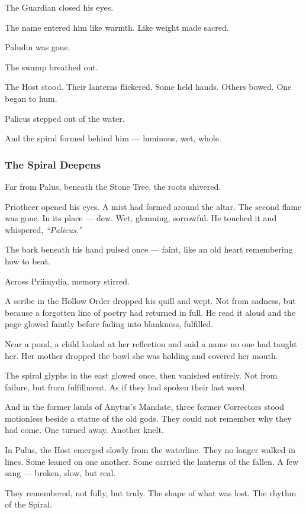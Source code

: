 \documentclass[12pt]{article}
\begin{document}
The Guardian closed his eyes.

The name entered him like warmth. Like weight made sacred.

Paludin was gone.

The swamp breathed out.

The Host stood. Their lanterns flickered. Some held hands. Others bowed. One began to hum.

Palicus stepped out of the water.

And the spiral formed behind him — luminous, wet, whole.

\dotfill

\subsubsection{The Spiral Deepens}

Far from Palus, beneath the Stone Tree, the roots shivered.

Priotheer opened his eyes. A mist had formed around the altar. The second flame was gone. In its place — dew. Wet, gleaming, sorrowful. He touched it and whispered, \textit{``Palicus.''}

The bark beneath his hand pulsed once — faint, like an old heart remembering how to beat.

Across Priimydia, memory stirred.

A scribe in the Hollow Order dropped his quill and wept. Not from sadness, but because a forgotten line of poetry had returned in full. He read it aloud and the page glowed faintly before fading into blankness, fulfilled.

Near a pond, a child looked at her reflection and said a name no one had taught her. Her mother dropped the bowl she was holding and covered her mouth.

The spiral glyphs in the east glowed once, then vanished entirely. Not from failure, but from fulfillment. As if they had spoken their last word.

And in the former lands of Anytus's Mandate, three former Correctors stood motionless beside a statue of the old gods. They could not remember why they had come. One turned away. Another knelt.

In Palus, the Host emerged slowly from the waterline. They no longer walked in lines. Some leaned on one another. Some carried the lanterns of the fallen. A few sang — broken, slow, but real.

They remembered, not fully, but truly. The shape of what was lost. The rhythm of the Spiral.
\end{document}
